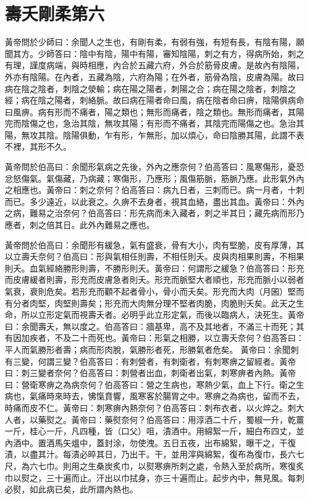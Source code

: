 \section{壽夭剛柔第六}

黃帝問於少師曰：余聞人之生也，有剛有柔，有弱有強，有短有長，有陰有陽，願聞其方。少師答曰：陰中有陰，陽中有陽，審知陰陽，刺之有方，得病所始，刺之有理，謹度病端，與時相應，內合於五藏六府，外合於筋骨皮膚。是故內有陰陽，外亦有陰陽。在內者，五藏為陰，六府為陽；在外者，筋骨為陰，皮膚為陽。故曰病在陰之陰者，刺陰之滎輸；病在陽之陽者，刺陽之合；病在陽之陰者，刺陰之經；病在陰之陽者，刺絡脈。故曰病在陽者命曰風，病在陰者命曰痹，陰陽俱病命曰風痹。病有形而不痛者，陽之類也；無形而痛者，陰之類也。無形而痛者，其陽完而陰傷之也，急治其陰，無攻其陽；有形而不痛者，其陰完而陽傷之也。急治其陽，無攻其陰。陰陽俱動，乍有形，乍無形，加以煩心，命曰陰勝其陽，此謂不表不裡，其形不久。

黃帝問於伯高曰：余聞形氣病之先後，外內之應奈何？伯高答曰：風寒傷形，憂恐忿怒傷氣。氣傷藏，乃病藏；寒傷形，乃應形；風傷筋脈，筋脈乃應。此形氣外內之相應也。黃帝曰：刺之奈何？伯高答曰：病九日者，三刺而已。病一月者，十刺而已。多少遠近，以此衰之。久痹不去身者，視其血絡，盡出其血。黃帝曰：外內之病，難易之治奈何？伯高答曰：形先病而未入藏者，刺之半其日；藏先病而形乃應者，刺之倍其日。此外內難易之應也。

黃帝問於伯高曰：余聞形有緩急，氣有盛衰，骨有大小，肉有堅脆，皮有厚薄，其以立壽夭奈何？伯高曰：形與氣相任則壽，不相任則夭。皮與肉相果則壽，不相果則夭。血氣經絡勝形則壽，不勝形則夭。黃帝曰：何謂形之緩急？伯高答曰：形充而皮膚緩者則壽，形充而皮膚急者則夭。形充而脈堅大者順也，形充而脈小以弱者氣衰，衰則危矣。若形充而顴不起者骨小，骨小而夭矣。形充而大肉（月囷）堅而有分者肉堅，肉堅則壽矣；形充而大肉無分理不堅者肉脆，肉脆則夭矣。此天之生命，所以立形定氣而視壽夭者。必明乎此立形定氣，而後以臨病人，決死生。黃帝曰：余聞壽夭，無以度之。伯高答曰：牆基卑，高不及其地者，不滿三十而死；其有因加疾者，不及二十而死也。黃帝曰：形氣之相勝，以立壽夭奈何？伯高答曰：平人而氣勝形者壽；病而形肉脫，氣勝形者死，形勝氣者危矣。
黃帝曰：余聞刺有三變，何謂三變？伯高答曰：有刺營者，有刺衛者，有刺寒痹之留經者。黃帝曰：刺三變者奈何？伯高答曰：刺營者出血，刺衛者出氣，刺寒痹者內熱。黃帝曰：營衛寒痹之為病奈何？伯高答曰：營之生病也，寒熱少氣，血上下行。衛之生病也，氣痛時來時去，怫愾賁響，風寒客於腸胃之中。寒痹之為病也，留而不去，時痛而皮不仁。黃帝曰：刺寒痹內熱奈何？伯高答曰：刺布衣者，以火焠之。刺大人者，以藥熨之。黃帝曰：藥熨奈何？伯高答曰：用淳酒二十斤，蜀椒一升，乾薑一斤，桂心一斤，凡四種，皆（口父）咀，漬酒中。用綿絮一斤，細白布四丈，並內酒中。置酒馬矢熅中，蓋封涂，勿使洩。五日五夜，出布綿絮，曝干之，干復漬，以盡其汁。每漬必晬其日，乃出干。干，並用滓與綿絮，復布為復巾，長六七尺，為六七巾。則用之生桑炭炙巾，以熨寒痹所刺之處，令熱入至於病所，寒復炙巾以熨之，三十遍而止。汗出以巾拭身，亦三十遍而止。起步內中，無見風。每刺必熨，如此病已矣，此所謂內熱也。




